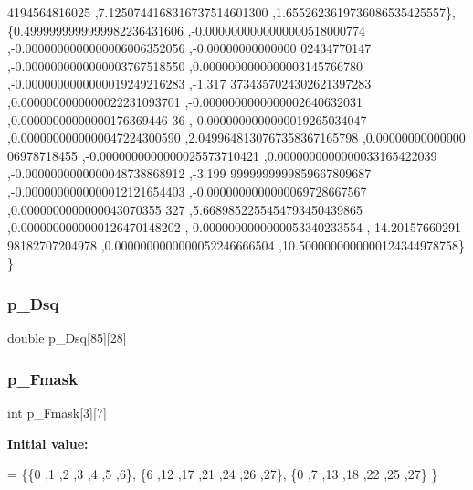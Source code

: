 \begin{DoxyCode}
      4194564816025 ,7.1250744168316737514601300 ,1.6552623619736086535425557\},
\{0.4999999999999982236431606 ,-0.0000000000000000518000774 ,-0.0000000000000006006352056 ,-0.00000000000000
      02434770147 ,-0.0000000000000003767518550 ,0.0000000000000003145766780 ,-0.0000000000000019249216283 ,-1.317
      3734357024302621397283 ,0.0000000000000022231093701 ,-0.0000000000000002640632031 ,0.00000000000000176369446
      36 ,-0.0000000000000019265034047 ,0.0000000000000047224300590 ,2.0499648130767358367165798 ,0.00000000000000
      06978718455 ,-0.0000000000000025573710421 ,0.0000000000000033165422039 ,-0.0000000000000048738868912 ,-3.199
      9999999999859667809687 ,-0.0000000000000012121654403 ,-0.0000000000000069728667567 ,0.0000000000000043070355
      327 ,5.6689852255454793450439865 ,0.0000000000000126470148202 ,-0.0000000000000053340233554 ,-14.20157660291
      98182707204978 ,0.0000000000000052246666504 ,10.5000000000000124344978758\}
\}
\end{DoxyCode}
\mbox{\label{a01002_a4fcb4952da1a7efa0f73f783679b4194}} 
\subsubsection{\texorpdfstring{p\+\_\+\+Dsq}{p\_Dsq}}
{\footnotesize\ttfamily double p\+\_\+\+Dsq\mbox{[}85\mbox{]}\mbox{[}28\mbox{]}}

\mbox{\label{a01002_a6b18ffc6e470dc9d5903792503239300}} 
\subsubsection{\texorpdfstring{p\+\_\+\+Fmask}{p\_Fmask}}
{\footnotesize\ttfamily int p\+\_\+\+Fmask\mbox{[}3\mbox{]}\mbox{[}7\mbox{]}}

{\bfseries Initial value\+:}
\begin{DoxyCode}
= \{\{0 ,1 ,2 ,3 ,4 ,5 ,6\},
\{6 ,12 ,17 ,21 ,24 ,26 ,27\},
\{0 ,7 ,13 ,18 ,22 ,25 ,27\}
\}
\end{DoxyCode}
\mbox{\label{a01002_a21d80bf79d58fbc86b7f27d5c4a7e305}} 
